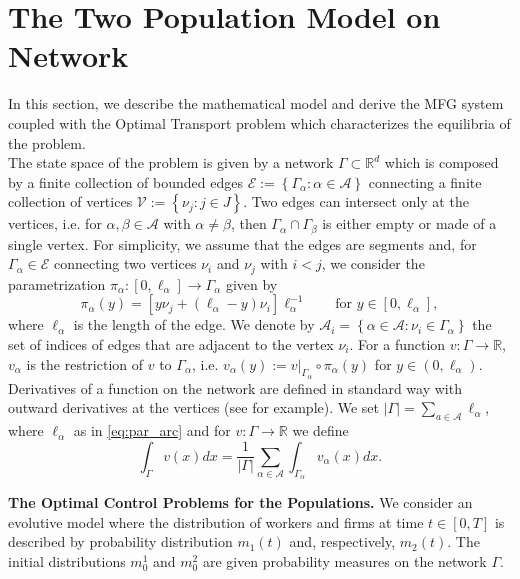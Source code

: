 \documentclass[smallextended,referee,envcountsect,]{svjour3}
\newcommand{\R}{{\mathbb{R}}}
\newcommand{\lra}{\longrightarrow}
\newcommand{\G}{\Gamma}
\newcommand{\cA}{{\mathcal A}}
\newcommand{\cV}{{\mathcal V}}
\renewcommand{\a}{{\alpha}}
\begin{document}
\section{The Two Population Model on Network}\label{sec:model}
In this section, we describe the mathematical model and derive the MFG system coupled with the Optimal Transport problem which characterizes the equilibria of the problem.\\
The state space of the problem is given by a network $\Gamma\subset\R^d$ which is composed by a finite collection of bounded edges $\mathcal{E}:=\left\{ \Gamma_{\alpha}:\alpha\in\cA\right\}$ connecting a finite collection of vertices $\cV:=\left\{\nu_{j}:j\in J\right\}$. Two edges can intersect only at the vertices, i.e. for $\alpha,\beta\in\cA$ with $\alpha\not=\beta$, then $\Gamma_\alpha\cap \Gamma_\beta$ is either empty or made of a single vertex. For simplicity, we assume that the edges are segments and, for $\Gamma_{\alpha}\in\mathcal{E}$ connecting two vertices $\nu_i$ and $\nu_j$ with $i<j$, we consider the parametrization $\pi_\alpha: [0,\ell_\alpha]\lra \Gamma_\alpha$ given by
\begin{equation}\label{eq:par_arc}	 
\pi_\alpha(y)=[y\nu_j+(\ell_\alpha-y)\nu_i]\ell_\alpha^{-1}\qquad\text{for } y\in[0,\ell_\alpha],
\end{equation} 
where $\ell_\alpha$ is the length of the edge. We   denote by $\cA_{i}=\left\{ \alpha\in\cA:\nu_{i}\in\Gamma_{\alpha}\right\}$  the set of indices of edges that are adjacent to the vertex $\nu_{i}$. For a function $v:\G\lra\R$,   $v_\a$  is the   restriction of $v$ to $\G_\alpha$, i.e. $v_{\alpha} (y):=v|_{\Gamma_{\alpha}}\circ\pi_{\alpha} (y)$ for $y\in (0,\ell_\alpha)$. 
Derivatives   of a function on the network are defined in standard way with outward derivatives at the vertices  (see \cite{achdou} for example). We set $|\Gamma|=\sum_{a\in \cA}\ell_\alpha$, where $\ell_\alpha$ as in \eqref{eq:par_arc} and for $v:\G\to\R$ we define
\begin{equation}\label{eq:int}
	\int_\Gamma v(x)dx=\frac{1}{|\Gamma|}\sum_{\alpha\in\cA} \int_{\Gamma_\alpha} v_\alpha(x)dx.
\end{equation}
\par\noindent\textbf{The Optimal Control Problems for the Populations.}
We consider an evolutive model where the distribution of workers and firms at time $t\in [0,T]$ is described by probability distribution $m_1(t)$ and, respectively, $m_2(t)$. The initial distributions $m^1_0$ and $m^2_0$ are given probability measures on the network $\G$.\\
\end{document}
